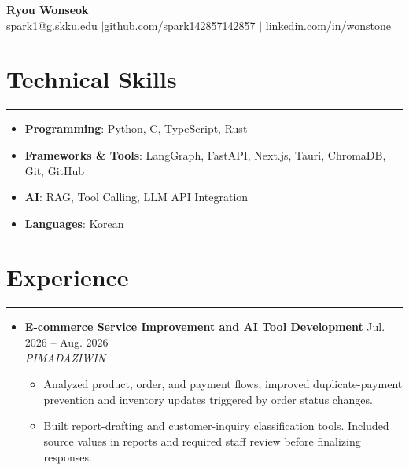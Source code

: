 \documentclass[letterpaper,10pt]{article}
\begin{document}
\begin{center}
\textbf{\LARGE Ryou Wonseok} \\ \vspace{2pt}\href{mailto:spark1@g.skku.edu}{\underline{spark1@g.skku.edu}} $|$\href{https://github.com/spark142857142857}{\underline{github.com/spark142857142857}} $|$ \href{https://www.linkedin.com/in/wonstone/}{\underline{linkedin.com/in/wonstone}}
\end{center}


\section*{Technical Skills}
\hrule
\vspace{4pt}
\begin{itemize}
\item[] \textbf{Programming}: Python, C, TypeScript, Rust
\item[] \textbf{Frameworks \& Tools}: LangGraph, FastAPI, Next.js, Tauri, ChromaDB, Git, GitHub
\item[] \textbf{AI}: RAG, Tool Calling, LLM API Integration
\item[] \textbf{Languages}: Korean
\end{itemize}


\section*{Experience}
\hrule
\vspace{4pt}
\begin{itemize}
\item[] \textbf{E-commerce Service Improvement and AI Tool Development} \hfill Jul. 2026 -- Aug. 2026 \\
\textit{PIMADAZIWIN}
\begin{itemize}
\item Analyzed product, order, and payment flows; improved duplicate-payment prevention and inventory updates triggered by order status changes.
\item Built report-drafting and customer-inquiry classification tools. Included source values in reports and required staff review before finalizing responses.
\end{itemize}
\end{itemize}


\end{document}

